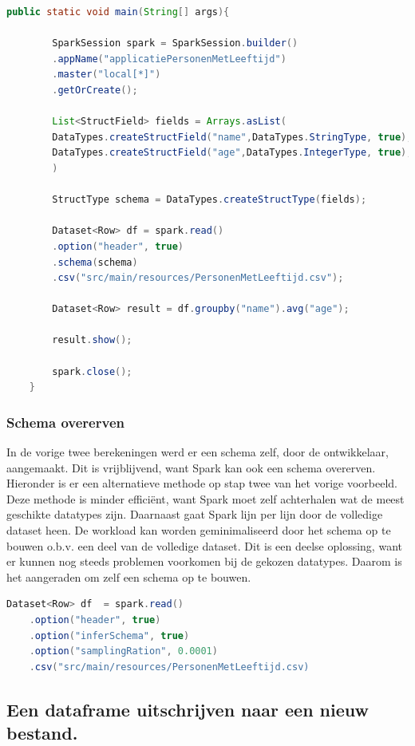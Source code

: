 \documentclass[a4paper,10pt,twoside]{report}
\begin{document}
\begin{lstlisting}[language=Java]
	public static void main(String[] args){
		
		SparkSession spark = SparkSession.builder()
		.appName("applicatiePersonenMetLeeftijd")
		.master("local[*]")
		.getOrCreate();
		
		List<StructField> fields = Arrays.asList(
		DataTypes.createStructField("name",DataTypes.StringType, true),
		DataTypes.createStructField("age",DataTypes.IntegerType, true);
		)
		
		StructType schema = DataTypes.createStructType(fields);
		
		Dataset<Row> df = spark.read()
		.option("header", true)
		.schema(schema)
		.csv("src/main/resources/PersonenMetLeeftijd.csv");
		
		Dataset<Row> result = df.groupby("name").avg("age");
		
		result.show();
		
		spark.close();
	}
\end{lstlisting}

\subsubsection{Schema overerven}

In de vorige twee berekeningen werd er een schema zelf, door de ontwikkelaar, aangemaakt. Dit is vrijblijvend, want Spark kan ook een schema overerven. Hieronder is er een alternatieve methode op stap twee van het vorige voorbeeld. Deze methode is minder efficiënt, want Spark moet zelf achterhalen wat de meest geschikte datatypes zijn. Daarnaast gaat Spark lijn per lijn door de volledige dataset heen. De workload kan worden geminimaliseerd door het schema op te bouwen o.b.v. een deel van de volledige dataset. Dit is een deelse oplossing, want er kunnen nog steeds problemen voorkomen bij de gekozen datatypes. Daarom is het aangeraden om zelf een schema op te bouwen.

\begin{lstlisting}[language=Java]
	Dataset<Row> df  = spark.read()
	.option("header", true)
	.option("inferSchema", true)
	.option("samplingRation", 0.0001)
	.csv("src/main/resources/PersonenMetLeeftijd.csv)
\end{lstlisting}

\subsection{Een dataframe uitschrijven naar een nieuw bestand.}
\end{document}
